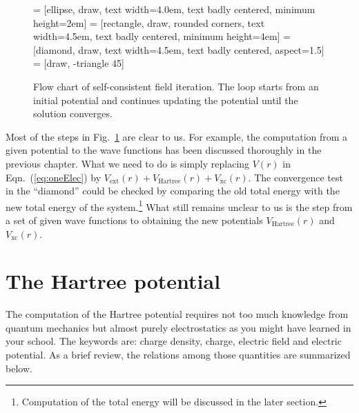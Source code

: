 \begin{figure}[h!]
\centering
\footnotesize
{}    = [ellipse, draw, text width=4.0em, text badly centered, minimum height=2em]
    = [rectangle, draw, rounded corners, text width=4.5em, text badly centered, minimum height=4em]
 = [diamond, draw, text width=4.5em, text badly centered, aspect=1.5]
     = [draw, -triangle 45]
\caption{Flow chart of self-consistent field iteration. The loop starts from an
initial potential and continues updating the potential until the solution converges.}
\label{fig:scfFlow}
\end{figure}

Most of the steps in Fig.~\ref{fig:scfFlow} are clear to us. For example, the
computation from a given potential to the wave functions has been discussed
thoroughly in the previous chapter. What we need to do is simply replacing $V(r)$
in Eqn.~(\ref{eq:oneElec}) by $V_{\text{ext}}(r) +  V_{\text{Hartree}}(r) + V_{\text{xc}}(r)$.
The convergence test in the ``diamond'' could be checked by comparing the old total energy
with the new total energy of the system.\footnote{Computation of the total energy
will be discussed in the later section.} What still remains unclear to
us is the step from a set of given wave functions to obtaining the new potentials
$V_{\text{Hartree}}(r)$ and $V_{\text{xc}}(r)$.

\section{The Hartree potential}
The computation of the Hartree potential requires not too much knowledge
from quantum mechanics but almost purely electrostatics as you might
have learned in your school. The keywords are: charge density, charge,
electric field and electric potential. As a brief review, the relations
among those quantities are summarized below.

